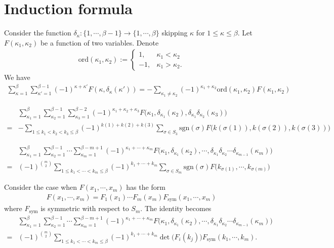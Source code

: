\documentclass{amsart}
\begin{document}
\appendix
\section{Induction formula}
{
    Consider the function $\delta_\kappa:\{1,\cdots,\beta-1\}\to\{1,\cdots,\beta\}$ skipping $\kappa$ for $1\leq \kappa\leq\beta$. Let $F(\kappa_1,\kappa_2)$ be a function of two variables. Denote 
    \begin{align*}
        \mathrm{ord}(\kappa_1,\kappa_2):=\begin{cases}
            1,&\kappa_1<\kappa_2\\
            -1,&\kappa_1>\kappa_2. 
        \end{cases}
    \end{align*}
    We have 
    \begin{align*}
        \sum_{\kappa=1}^\beta\sum_{\kappa'=1}^{\beta-1}(-1)^{\kappa+\kappa'}F(\kappa,\delta_\kappa(\kappa'))=-\sum_{\kappa_1\ne\kappa_2}(-1)^{\kappa_1+\kappa_2}\mathrm{ord}(\kappa_1,\kappa_2)F(\kappa_1,\kappa_2)
    \end{align*}

    \begin{align*}
        &\sum_{\kappa_1=1}^\beta\sum_{\kappa_2=1}^{\beta-1}\sum_{\kappa_3=1}^{\beta-2}(-1)^{\kappa_1+\kappa_2+\kappa_3}F\big(\kappa_1,\delta_{\kappa_1}(\kappa_2),\delta_{\kappa_1}\delta_{\kappa_2}(\kappa_3)\big)\\
        =&-\sum_{1\leq k_1<k_2<k_3\leq \beta}(-1)^{k(1)+k(2)+k(3)}\sum_{\sigma\in S_3}\mathrm{sgn}(\sigma)F\big(k(\sigma(1)),k(\sigma(2)),k(\sigma(3))\big)
    \end{align*}

    \begin{align*}
        &\sum_{\kappa_1=1}^\beta\sum_{\kappa_2=1}^{\beta-1}\cdots\sum_{\kappa_m=1}^{\beta-m+1}(-1)^{\kappa_1+\cdots+\kappa_m}F\Big(\kappa_1,\delta_{\kappa_1}(\kappa_2),\cdots,\delta_{\kappa_1}\delta_{\kappa_2}\cdots\delta_{\kappa_{m-1}}(\kappa_m)\Big)\\
        ={}&(-1)^{\binom{m}{2}}\sum_{1\leq k_1<\cdots<k_m\leq \beta}(-1)^{k_1+\cdots+k_m}\sum_{\sigma\in S_m}\mathrm{sgn}(\sigma)F\Big(k_{\sigma(1)},\cdots,k_{\sigma(m)}\Big)
    \end{align*}

    Consider the case when $F(x_1,\cdots,x_m)$ has the form 
    \begin{align*}
        F(x_1,\cdots,x_m)=F_1(x_1)\cdots F_m(x_m) F_{\mathrm{sym}}(x_1,\cdots,x_m)
    \end{align*}
    where $F_{\mathrm{sym}}$ is symmetric with respect to $S_m$. The identity becomes 
    \begin{align*}
        &\sum_{\kappa_1=1}^\beta\sum_{\kappa_2=1}^{\beta-1}\cdots\sum_{\kappa_m=1}^{\beta-m+1}(-1)^{\kappa_1+\cdots+\kappa_m}F\Big(\kappa_1,\delta_{\kappa_1}(\kappa_2),\cdots,\delta_{\kappa_1}\delta_{\kappa_2}\cdots\delta_{\kappa_{m-1}}(\kappa_m)\Big)\\
        ={}&(-1)^{\binom{m}{2}}\sum_{1\leq k_1<\cdots<k_m\leq \beta}(-1)^{k_1+\cdots+k_m}\det\big(F_i(k_j)\big)F_{\mathrm{sym}}(k_1,\cdots,k_m). 
    \end{align*}
}
\end{document}
